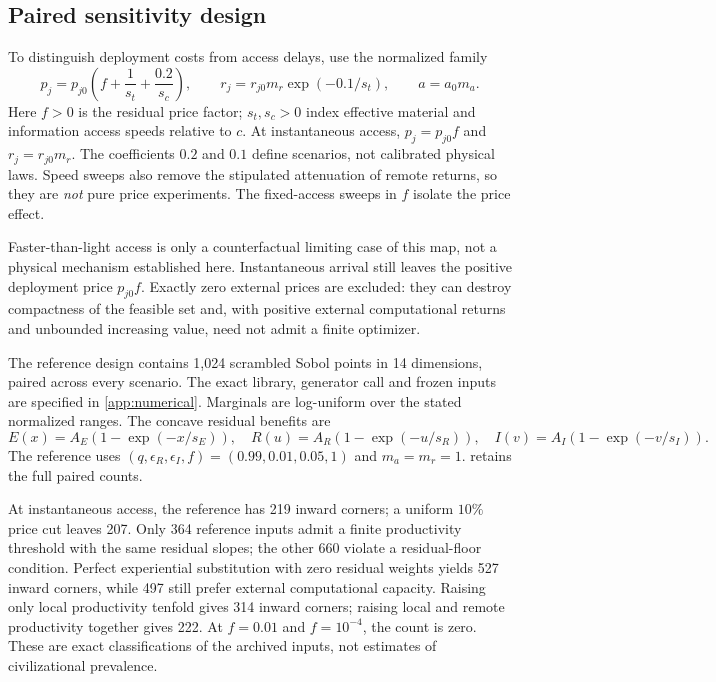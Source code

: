 \documentclass[11pt,a4paper]{article}
\theoremstyle{definition}\newtheorem{definition}{Definition}
\begin{document}
\subsection{Paired sensitivity design}
To distinguish deployment costs from access delays, use the normalized
family
\begin{equation}
 p_j=p_{j0}\left(f+\frac{1}{s_t}+\frac{0.2}{s_c}\right),\qquad
 r_j=r_{j0}m_r\exp(-0.1/s_t),\qquad a=a_0m_a.
 \label{eq:speed-map}
\end{equation}
Here $f>0$ is the residual price factor; $s_t,s_c>0$ index effective
material and information access speeds relative to $c$.
At instantaneous access, $p_j=p_{j0}f$ and $r_j=r_{j0}m_r$.
The coefficients $0.2$ and $0.1$ define scenarios, not calibrated physical
laws. Speed sweeps also remove the stipulated attenuation of remote
returns, so they are \emph{not} pure price experiments. The fixed-access
sweeps in $f$ isolate the price effect.

Faster-than-light access is only a counterfactual limiting case of this
map, not a physical mechanism established here. Instantaneous arrival
still leaves the positive deployment price $p_{j0}f$. Exactly zero
external prices are excluded: they can destroy compactness of the
feasible set and, with positive external computational returns and
unbounded increasing value, need not admit a finite optimizer.

The reference design contains 1,024 scrambled Sobol points in 14
dimensions, paired across every scenario. The exact library, generator
call and frozen inputs are specified in \cref{app:numerical}. Marginals
are log-uniform over the stated normalized ranges. The concave residual
benefits are
\begin{equation}
 E(x)=A_E(1-\exp(-x/s_E)),\quad
 R(u)=A_R(1-\exp(-u/s_R)),\quad
 I(v)=A_I(1-\exp(-v/s_I)).
 \label{eq:benefit-family}
\end{equation}
The reference uses $(q,\epsilon_R,\epsilon_I,f)=(0.99,0.01,0.05,1)$
and $m_a=m_r=1$.  retains the full paired counts.

At instantaneous access, the reference has 219 inward corners; a
uniform $10\%$ price cut leaves 207. Only 364 reference inputs admit
a finite productivity threshold with the same residual slopes; the other
660 violate a residual-floor condition. Perfect experiential substitution
with zero residual weights yields 527 inward corners, while 497 still
prefer external computational capacity. Raising only local productivity
tenfold gives 314 inward corners; raising local and remote productivity
together gives 222. At $f=0.01$ and $f=10^{-4}$, the count is zero.
These are exact classifications of the archived inputs, not estimates of
civilizational prevalence.
\end{document}
